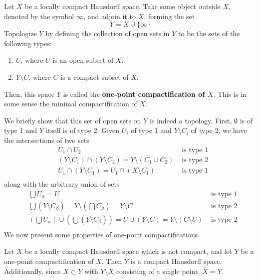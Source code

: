 \documentclass{article}
\begin{document}
    \begin{definition}
    Let $X$ be a locally compact Hausdorff space. Take some object outside $X$, denoted by the symbol $\infty$, and adjoin it to $X$, forming the set
    \[Y = X \cup \{\infty\}\]
    Topologize $Y$ by defining the collection of open sets in $Y$ to be the sets of the following types:
    \begin{enumerate}
        \item $U$, where $U$ is an open subset of $X$. 
        \item $Y \setminus C$, where $C$ is a compact subset of $X$.
    \end{enumerate}
    Then, this space $Y$ is called the \textbf{one-point compactification of $X$}. This is in some sense the minimal compactification of $X$. 
    \end{definition}
    We briefly show that this set of open sets on $Y$ is indeed a topology. First, $\emptyset$ is of type 1 and $Y$ itself is of type 2. Given $U_i$ of type 1 and $Y \setminus C_i$ of type 2, we have the intersections of two sets
    \begin{align*}
        &U_1 \cap U_2 & \text{ is type 1} \\
        &(Y \setminus C_1) \cap (Y \setminus C_2) = Y \setminus (C_1 \cup C_2) & \text{ is type 2} \\
        &U_1 \cap (Y \setminus C_1) = U_1 \cap (X \setminus C_1) & \text{ is type 1} \\
    \end{align*}
    along with the arbitrary union of sets
    \begin{align*}
        &\bigcup U_\alpha = U & \text{ is type 1} \\
        &\bigcup (Y \setminus C_\beta) = Y \setminus (\bigcap C_\beta) = Y \setminus C & \text{ is type 2} \\
        &(\bigcup U_\alpha) \cup ( \bigcup (Y \setminus C_\beta)) = U \cup (Y \setminus C) = Y \setminus (C \setminus U) & \text{ is type 2} \\
    \end{align*}
    We now present some properties of one-point compactifications. 

    \begin{theorem}
    Let $X$ be a locally compact Hausdorff space which is not compact, and let $Y$ be a one-point compactification of $X$. Then $Y$ is a compact Hausdorff space. Additionally, since $X \subset Y$ with $Y \setminus X$ consisting of a single point, $\bar{X} = Y$. 
    \end{theorem}
\end{document}
